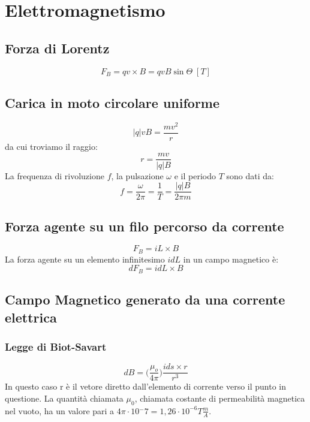 \chapter*{Elettromagnetismo}

    \section*{Forza di Lorentz}
        \begin{equation*}
            F_B = qv \times B = qvB\sin\Theta \; [T]
        \end{equation*}

    \section*{Carica in moto circolare uniforme}
        \begin{equation*}
            |q|vB = \frac{mv^2}{r}
        \end{equation*}
    da cui troviamo il raggio:
        \begin{equation*}
            r = \frac{mv}{|q|B}
        \end{equation*}
    La frequenza di rivoluzione $f$, la pulsazione $\omega$ e il periodo $T$
    sono dati da:
        \begin{equation*}
            f = \frac{\omega}{2\pi} = \frac{1}{T} = \frac{|q|B}{2\pi m}
        \end{equation*}

    \section*{Forza agente su un filo percorso da corrente}
        \begin{equation*}
            F_B = iL\times B
        \end{equation*}
    La forza agente su un elemento infinitesimo $idL$ in un campo magnetico è:
        \begin{equation*}
            dF_B = idL\times B
        \end{equation*}

    \section*{Campo Magnetico generato da una corrente elettrica}

        \subsection*{Legge di Biot-Savart}
            \begin{equation*}
                dB = \Bigg(\frac{\mu_o}{4\pi}\Bigg)\frac{ids\times r}{r^3}
            \end{equation*}
        In questo caso r è il vetore diretto dall'elemento di corrente verso il
        punto in questione. La quantità chiamata $\mu_0$, chiamata costante di 
        permeabilità magnetica nel vuoto, ha un valore pari a $4\pi \cdot 
        10{^-7} = 1,26 \cdot 10^{-6} T \frac{m}{A}$.

